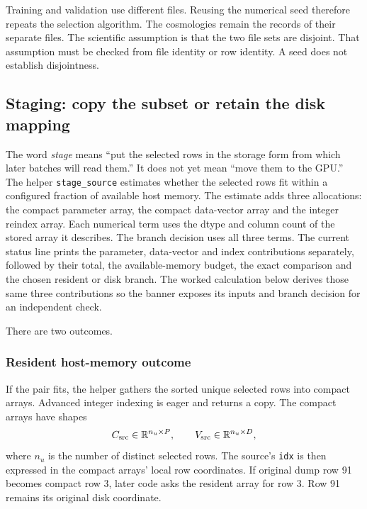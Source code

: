 \documentclass[10pt,aps,prd,twocolumn,nofootinbib]{revtex4-2}
\newcommand{\code}[1]{\texttt{#1}}
\begin{document}
Training and validation use different files.  Reusing the numerical seed
therefore repeats the selection algorithm.  The cosmologies remain the records
of their separate files.
The scientific assumption is that the two file sets are disjoint.  That
assumption must be checked from file identity or row identity.  A seed does not
establish disjointness.

\subsection{Staging: copy the subset or retain the disk mapping}

The word \emph{stage} means ``put the selected rows in the storage form from
which later batches will read them.''  It does not yet mean ``move them to the
GPU.''  The helper \code{stage\_source} estimates whether the selected rows
fit within a configured fraction of available host memory.  The estimate
adds three allocations: the compact parameter array, the compact data-vector
array and the integer reindex array.  Each numerical term uses the dtype and
column count of the stored array it describes.  The branch decision uses all
three terms.  The current status line prints the parameter, data-vector and
index contributions separately, followed by their total, the available-memory
budget, the exact comparison and the chosen resident or disk branch.  The
worked calculation below derives those same three contributions so the banner
exposes its inputs and branch decision for an independent check.

There are two outcomes.

\subsubsection{Resident host-memory outcome}

If the pair fits, the helper gathers the sorted unique selected rows into
compact arrays.  Advanced integer indexing is eager and returns a copy.  The
compact arrays have shapes
\begin{equation}
  C_{\rm src}\in\mathbb{R}^{n_u\times P},
  \qquad
  V_{\rm src}\in\mathbb{R}^{n_u\times D},
\end{equation}
where $n_u$ is the number of distinct selected rows.  The source's
\code{idx} is then expressed in the compact arrays' local row coordinates.
If original dump row 91 becomes compact row 3, later code asks the resident
array for row 3.  Row 91 remains its original disk coordinate.
\end{document}
